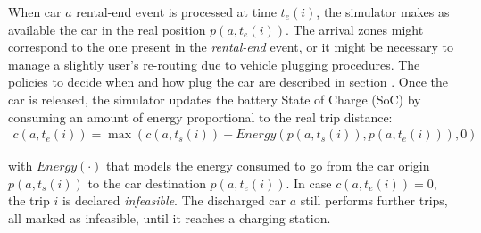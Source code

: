 When car $a$ rental-end event is processed at time $t_{e}(i)$, the simulator makes as available the car in the real position $p(a,t_{e}(i))$. The arrival zones might correspond to the one present in the \emph{rental-end} event, or it might be necessary to manage a slightly user's re-routing due to vehicle plugging procedures. The policies to decide when and how plug the car are described in section . Once the car is released, the simulator updates the battery State of Charge (SoC) by consuming an amount of energy proportional to the real trip distance:
\begin{eqnarray*}
	c(a,t_{e}(i)) = \nonumber \hspace{0cm}   \max{(c(a,t_{s}(i)) - Energy(p(a,t_{s}(i)), p(a,t_{e}(i))), 0)} 
\end{eqnarray*}

with $Energy(\cdot)$ that models the energy consumed to go from the car origin $p(a,t_{s}(i))$ to the car destination $p(a,t_{e}(i))$.
In case $c(a,t_{e}(i)) = 0$, the trip $i$ is declared {\it infeasible}. 
The discharged car $a$ still performs further trips, all marked as infeasible, until it reaches a charging station.


